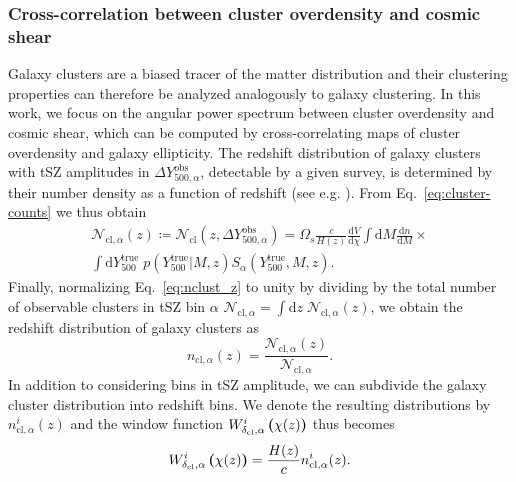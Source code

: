 \documentclass[%
 reprint,
nofootinbib,
 amsmath,amssymb,
 aps,
]{revtex4-1}
\begin{document}
\subsubsection{Cross-correlation between cluster overdensity and cosmic shear} 

Galaxy clusters are a biased tracer of the matter distribution and their clustering properties can therefore be analyzed analogously to galaxy clustering. In this work, we focus on the angular power spectrum between cluster overdensity and cosmic shear, which can be computed by cross-correlating maps of cluster overdensity and galaxy ellipticity. The redshift distribution of galaxy clusters with tSZ amplitudes in $\Delta Y_{500, \alpha}^{\mathrm{obs}}$, detectable by a given survey, is determined by their number density as a function of redshift (see e.g. \cite{Fedeli:2009}). From Eq.~\ref{eq:cluster-counts} we thus obtain
\begin{equation}
\begin{aligned}
\mathcal{N}_{\mathrm{cl}, \alpha}(z)  \coloneqq \mathcal{N}_{\mathrm{cl}}(z, \Delta Y_{500, \alpha}^{\mathrm{obs}}) =  \Omega_{s} \frac{c}{H(z)} \frac{\mathrm{d}V}{\mathrm{d}\chi} \int \mathrm{d}M \frac{\mathrm{d}n}{\mathrm{d}M} \times \\ \int \mathrm{d}Y_{500}^{\mathrm{true}}\; p(Y_{500}^{\mathrm{true}}|M, z) S_{\alpha}(Y_{500}^{\mathrm{true}}, M, z).
\label{eq:nclust_z}
\end{aligned}
\end{equation}
Finally, normalizing Eq.~\ref{eq:nclust_z} to unity by dividing by the total number of observable clusters in tSZ bin $\alpha$ $\mathcal{N}_{\mathrm{cl}, \alpha}=\int \mathrm{d}z \; \mathcal{N}_{\mathrm{cl}, \alpha}(z)$, we obtain the redshift distribution of galaxy clusters as
\begin{equation}
n_{\mathrm{cl}, \alpha}(z) = \frac{\mathcal{N}_{\mathrm{cl}, \alpha}(z)}{\mathcal{N}_{\mathrm{cl}, \alpha}}.
\end{equation}
In addition to considering bins in tSZ amplitude, we can subdivide the galaxy cluster distribution into redshift bins. We denote the resulting distributions by $n^{i}_{\mathrm{cl}, \alpha}(z)$ and the window function $W^{i}_{\delta_{\mathrm{cl}}, \alpha}\boldsymbol{\left(}\chi(z)\boldsymbol{\right)}$ thus becomes
\begin{equation}
W^{i}_{\delta_{\mathrm{cl}}, \alpha}\boldsymbol{\left(}\chi(z)\boldsymbol{\right)} = \frac{H(z)}{c} n^{i}_{\mathrm{cl}, \alpha}(z).
\end{equation}
\end{document}
